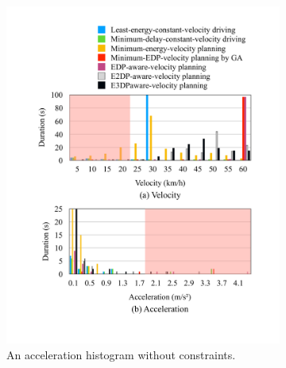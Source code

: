 \documentclass[onecolumn]{IEEEconf}
\begin{document}
\begin{description}
\begin{figure}[h!]
\begin{subfigure}{0.45\textwidth}
	\includegraphics[width=\hsize]{Figures/Histogram_noconst_acc.pdf}
	\caption{An acceleration histogram without constraints.}
	\label{fig:histogram_noconst_acc}
	\end{subfigure}
	\begin{subfigure}{0.45\textwidth}

\end{subfigure}
\end{figure}
\end{description}
\end{document}
